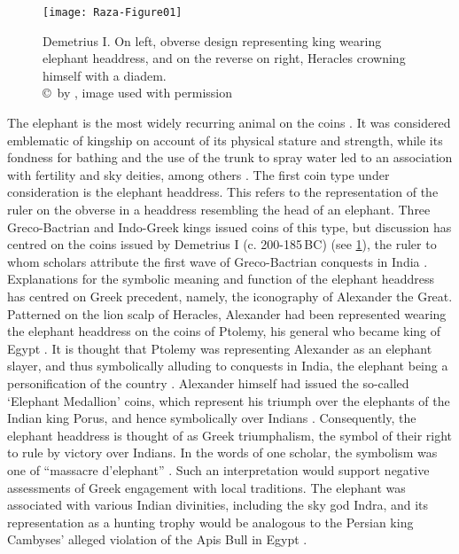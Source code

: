 \documentclass{ijsra}
\renewcommand\BC{{\,BC\xspace}}
\begin{document}
\begin{figure}[!htb] %
	\centering
	\texttt{[image: Raza-Figure01]}
	\caption{Demetrius I. On left, obverse design representing king wearing elephant headdress, and on the reverse on right, Heracles crowning himself with a diadem.
		{\normalfont\scriptsize \\ \copyright\ by \cite{Coin}, image used with permission}}
	\label{fig:Raza-Figure01}
\end{figure}

The elephant is the most widely recurring animal on the coins \parencite[383--384]{Bopearachchi1991}.
It was considered emblematic of kingship on account of its physical stature and strength,
while its fondness for bathing and the use of the trunk to spray water led to an association with fertility and sky deities,
among others \parencites[15--19]{Gupta1983}[156]{Iossif2010}.
The first coin type under consideration is the elephant headdress.
This refers to the representation of the ruler on the obverse in a headdress resembling the head of an elephant.
Three Greco-Bactrian and Indo-Greek kings issued coins of this type, but discussion has centred on the coins issued by Demetrius I
(c. 200-185\BC) (see \cref{fig:Raza-Figure01}), the ruler to whom scholars attribute the first wave of Greco-Bactrian conquests in India
\parencites[47--48]{Bopearachchi2011}[17--18]{Kalita1997}.
Explanations for the symbolic meaning and function of the elephant headdress has centred on Greek precedent,
namely, the iconography of Alexander the Great.
Patterned on the lion scalp of Heracles, Alexander had been represented wearing the elephant headdress on the coins of Ptolemy,
his general who became king of Egypt \parencite[21--31]{Lorber2012}.
It is thought that Ptolemy was representing Alexander as an elephant slayer, and thus symbolically alluding to conquests in India,
the elephant being a personification of the country \parencites[50]{Curtis2007}[335]{Green1993}[104--105]{MacDowall2007a}.
Alexander himself had issued the so-called ‘Elephant Medallion’ coins, which represent his triumph over the elephants of the Indian
king Porus, and hence symbolically over Indians \parencite[151--152]{Holt2003}.
Consequently, the elephant headdress is thought of as Greek triumphalism, the symbol of their right to rule by victory over Indians.
In the words of one scholar, the symbolism was one of “massacre d’elephant” \parencite[232, 492]{Widemann2009}.
Such an interpretation would support negative assessments of Greek engagement with local traditions.
The elephant was associated with various Indian divinities, including the sky god Indra, and its representation as a hunting trophy
would be analogous to the Persian king Cambyses’ alleged violation of the Apis Bull in Egypt \parencite[15--19]{Gupta1983}.
\end{document}
